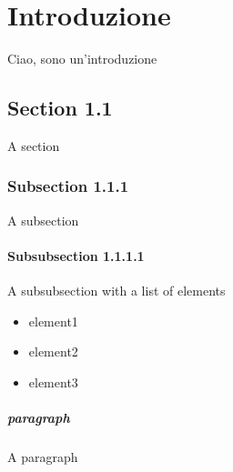 \chapter{Introduzione}
Ciao, sono un'introduzione
\section{Section 1.1}
A section
\subsection{Subsection 1.1.1}
A subsection
\subsubsection{Subsubsection 1.1.1.1}
A subsubsection with a list of elements
\begin{itemize}
	\item element1
	\item element2
	\item element3
\end{itemize}
\paragraph{paragraph} A paragraph